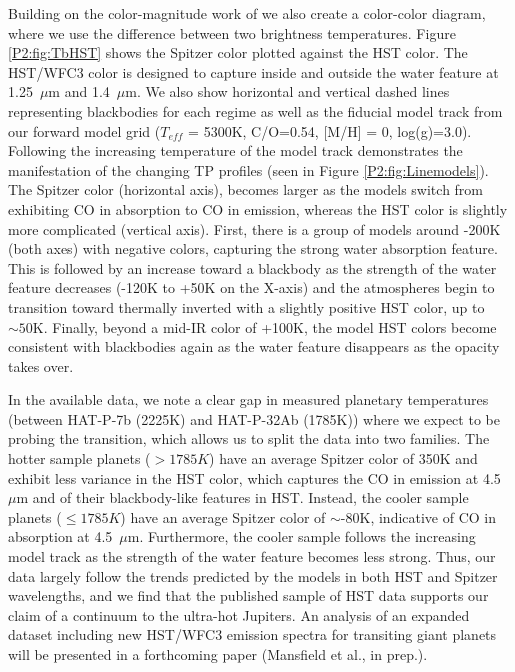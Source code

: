 Building on the color-magnitude work of \citet{Triaud2014c} we also create a color-color diagram, where we use the difference between two brightness temperatures. Figure \ref{P2:fig:TbHST} shows the Spitzer color plotted against the HST color. The HST/WFC3 color is designed to capture inside and outside the water feature at 1.25~$\mu$m and 1.4~$\mu$m. We also show horizontal and vertical dashed lines representing blackbodies for each regime as well as the fiducial model track from our forward model grid ($T_{eff}$ = 5300K, C/O=0.54, [M/H] = 0, log(g)=3.0). Following the increasing temperature of the model track demonstrates the manifestation of the changing TP profiles (seen in Figure \ref{P2:fig:Linemodels}). The Spitzer color (horizontal axis), becomes larger as the models switch from exhibiting CO in absorption to CO in emission, whereas the HST color is slightly more complicated (vertical axis). First, there is a group of models around -200K (both axes) with negative colors, capturing the strong water absorption feature. This is followed by an increase toward a blackbody as the strength of the water feature decreases (-120K to +50K on the X-axis) and the atmospheres begin to transition toward thermally inverted with a slightly positive HST color, up to $\sim50$K. Finally, beyond a mid-IR color of +100K, the model HST colors become consistent with blackbodies again as the water feature disappears as the  opacity takes over.

In the available data, we note a clear gap in measured planetary temperatures (between HAT-P-7b (2225K) and HAT-P-32Ab (1785K)) where we expect to be probing the transition, which allows us to split the data into two families. The hotter sample planets ($>1785K$) have an average Spitzer color of 350K and exhibit less variance in the HST color, which captures the CO in emission at 4.5~$\mu$m and of their blackbody-like features in HST. Instead, the cooler sample planets ($\leq1785K$) have an average Spitzer color of $\sim$-80K, indicative of CO in absorption at 4.5~$\mu$m. Furthermore, the cooler sample follows the increasing model track as the strength of the water feature becomes less strong. Thus, our data   largely follow  the trends predicted by the models in both HST and Spitzer wavelengths, and we find that the published sample of HST data supports our claim of a continuum to the ultra-hot Jupiters. An analysis of an expanded dataset including new HST/WFC3 emission spectra for transiting giant planets will be presented in a forthcoming paper (Mansfield et al., in prep.).


